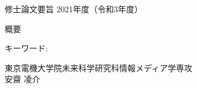 \newpage
\pagestyle{plain}
\begin{center}
\LARGE{修士論文要旨 \hspace{10mm} 2021年度（令和3年度）}\\

\vspace{10mm}

\end{center}

\begin{center}
概要\\
\end{center}


\begin{flushleft}キーワード:\\
\end{flushleft}


\begin{center}
\vspace{10mm}
\begin{flushright}\large 東京電機大学院未来科学研究科情報メディア学専攻\\
\LARGE 安齋 凌介\\
\end{flushright}
\end{center}
